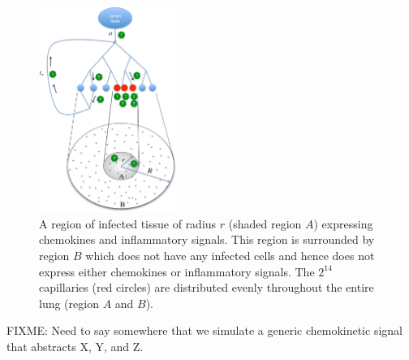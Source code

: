 \documentclass[10pt]{article}
\begin{document}
\begin{figure}[ht!]
\begin{center}
\includegraphics[width=0.4\textwidth]{SystemChart}
\end{center}
\caption{A region of infected tissue of radius $r$ (shaded region $A$) expressing chemokines and inflammatory signals. This region is surrounded by region $B$ which does not have any infected cells and hence does not express either chemokines or inflammatory signals. The $2^{14}$ capillaries (red circles) are distributed evenly throughout the entire lung (region $A$ and $B$).}
\label{fig:systemchart}
\end{figure}


FIXME: Need to say somewhere that we simulate a generic chemokinetic signal that abstracts X, Y, and Z.
\end{document}
